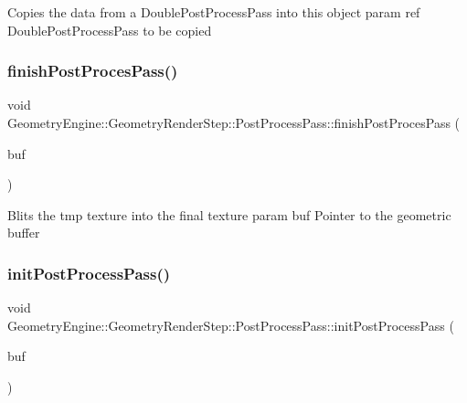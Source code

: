 Copies the data from a Double\+Post\+Process\+Pass into this object param ref Double\+Post\+Process\+Pass to be copied \mbox{\label{class_geometry_engine_1_1_geometry_render_step_1_1_post_process_pass_abfc2e269aad1157916f6c3c72b570ae9}} 
\subsubsection{\texorpdfstring{finishPostProcesPass()}{finishPostProcesPass()}}
{\footnotesize\ttfamily void Geometry\+Engine\+::\+Geometry\+Render\+Step\+::\+Post\+Process\+Pass\+::finish\+Post\+Proces\+Pass (\begin{DoxyParamCaption}\item[{\mbox{\hyperlink{class_geometry_engine_1_1_geometry_buffer_1_1_g_buffer}{Geometry\+Buffer\+::\+G\+Buffer}} $\ast$}]{buf }\end{DoxyParamCaption})\hspace{0.3cm}{\ttfamily [protected]}}

Blits the tmp texture into the final texture param buf Pointer to the geometric buffer \mbox{\label{class_geometry_engine_1_1_geometry_render_step_1_1_post_process_pass_ae0bfafe4123decb5eb65e1decc3c07ba}} 
\subsubsection{\texorpdfstring{initPostProcessPass()}{initPostProcessPass()}}
{\footnotesize\ttfamily void Geometry\+Engine\+::\+Geometry\+Render\+Step\+::\+Post\+Process\+Pass\+::init\+Post\+Process\+Pass (\begin{DoxyParamCaption}\item[{\mbox{\hyperlink{class_geometry_engine_1_1_geometry_buffer_1_1_g_buffer}{Geometry\+Buffer\+::\+G\+Buffer}} $\ast$}]{buf }\end{DoxyParamCaption})\hspace{0.3cm}{\ttfamily [protected]}}

